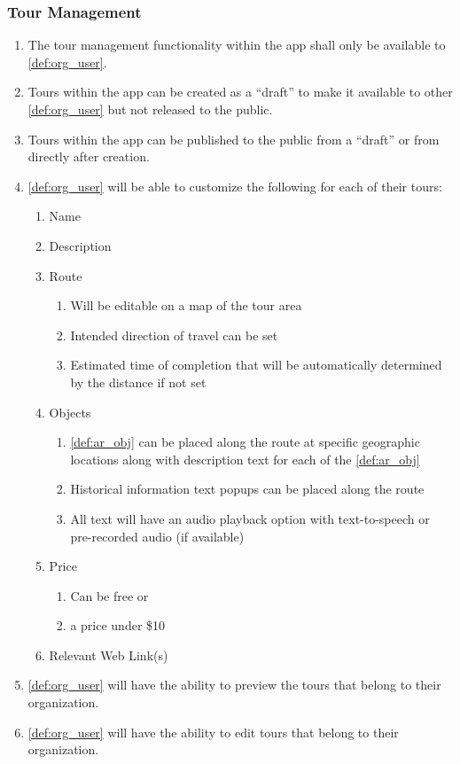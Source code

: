 \documentclass{article}
\begin{document}
\subsubsection{Tour Management}
\label{ssub:tour_management}

\begin{enumerate}[align=left, label=\textbf{TM-FR\arabic*:}]
    \item The tour management functionality within the app shall only be available to \ref{def:org_user}.
    \item Tours within the app can be created as a “draft” to make it available to other \ref{def:org_user} but not released to the public.
    \item Tours within the app can be published to the public from a “draft” or from directly after creation.
    \item \ref{def:org_user} will be able to customize the following for each of their tours:
    \begin{enumerate}
        \item Name
        \item Description
        \item Route
        \begin{enumerate}
            \item Will be editable on a map of the tour area
            \item Intended direction of travel can be set
            \item Estimated time of completion that will be automatically determined by the distance if not set
        \end{enumerate}
        \item Objects
        \begin{enumerate}
            \item \ref{def:ar_obj} can be placed along the route at specific geographic locations along with description text for each of the \ref{def:ar_obj}
            \item Historical information text popups can be placed along the route
            \item All text will have an audio playback option with text-to-speech or pre-recorded audio (if available)
        \end{enumerate}
        \item Price
        \begin{enumerate}
            \item Can be free or
            \item a price under \$10
        \end{enumerate}
        \item Relevant Web Link(s)
    \end{enumerate}
    \item \ref{def:org_user} will have the ability to preview the tours that belong to their organization.
    \item \ref{def:org_user} will have the ability to edit tours that belong to their organization.
\end{enumerate}
\end{document}
